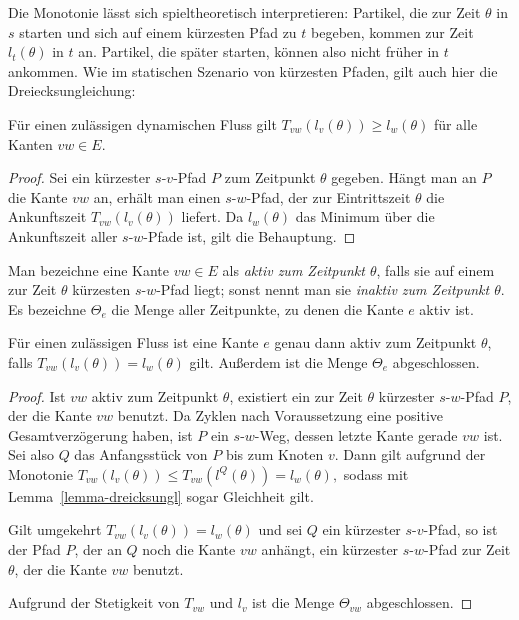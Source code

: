 Die Monotonie lässt sich spieltheoretisch interpretieren:
Partikel, die zur Zeit $\theta$ in $s$ starten und sich auf einem kürzesten Pfad zu $t$ begeben, kommen zur Zeit $l_t(\theta)$ in $t$ an.
Partikel, die später starten, können also nicht früher in $t$ ankommen.
Wie im statischen Szenario von kürzesten Pfaden, gilt auch hier die Dreiecksungleichung: 

\begin{lemma}\label{lemma-dreicksungl}
	Für einen zulässigen dynamischen Fluss gilt 
	$T_{vw}(l_v(\theta)) \geq l_w(\theta)$ für alle Kanten $vw\in E$.
\end{lemma}
\begin{proof}
	Sei ein kürzester $s$-$v$-Pfad $P$ zum Zeitpunkt $\theta$ gegeben.
	Hängt man an $P$ die Kante $vw$ an, erhält man einen $s$-$w$-Pfad, der zur Eintrittszeit $\theta$ die Ankunftszeit $T_{vw}(l_v(\theta))$ liefert.
	Da $l_w(\theta)$ das Minimum über die Ankunftszeit aller $s$-$w$-Pfade ist, gilt die Behauptung.
\end{proof}

\begin{definition}
	Man bezeichne eine Kante $vw\in E$ als \emph{aktiv zum Zeitpunkt $\theta$}, falls sie auf einem zur Zeit $\theta$ kürzesten $s$-$w$-Pfad liegt; sonst nennt man sie \emph{inaktiv zum Zeitpunkt $\theta$}.
	Es bezeichne $\Theta_e$ die Menge aller Zeitpunkte, zu denen die Kante $e$ aktiv ist.
\end{definition}

\begin{proposition}
	Für einen zulässigen Fluss ist eine Kante $e$ genau dann aktiv zum Zeitpunkt $\theta$, falls $T_{vw}(l_v(\theta)) = l_w(\theta)$ gilt.
	Außerdem ist die Menge $\Theta_e$ abgeschlossen.
\end{proposition}
\begin{proof}
	Ist $vw$ aktiv zum Zeitpunkt $\theta$, existiert ein zur Zeit $\theta$ kürzester $s$-$w$-Pfad $P$, der die Kante $vw$ benutzt.
	Da Zyklen nach Voraussetzung eine positive Gesamtverzögerung haben, ist $P$ ein $s$-$w$-Weg, dessen letzte Kante gerade $vw$ ist.
	Sei also $Q$ das Anfangsstück von $P$ bis zum Knoten $v$.
	Dann gilt aufgrund der Monotonie $
	T_{vw}(l_v(\theta)) \leq T_{vw}( l^Q(\theta) ) = l_w(\theta),
	$
	sodass mit Lemma~\ref{lemma-dreicksungl} sogar Gleichheit gilt.
	
	Gilt umgekehrt $T_{vw}(l_v(\theta)) = l_w(\theta)$ und sei $Q$ ein kürzester $s$-$v$-Pfad, so ist der Pfad $P$, der an $Q$ noch die Kante $vw$ anhängt, ein kürzester $s$-$w$-Pfad zur Zeit $\theta$, der die Kante $vw$ benutzt.
	
	Aufgrund der Stetigkeit von $T_{vw}$ und $l_v$ ist die Menge $\Theta_{vw}$ abgeschlossen.
\end{proof}


